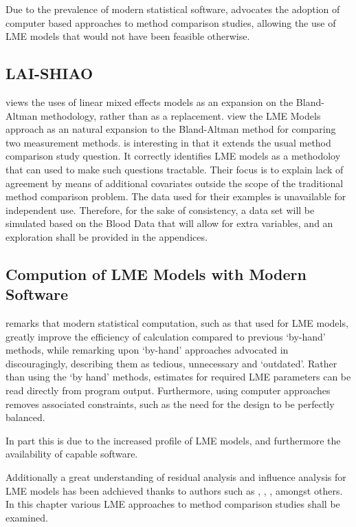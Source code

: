 \documentclass[12pt, a4paper]{report}
\theoremstyle{plain}
\theoremstyle{definition}
\theoremstyle{remark}
\begin{document}
	
	Due to the prevalence of modern statistical software, \citet{BXC2008} advocates the adoption of computer based approaches to method comparison studies, allowing the use of LME models that would not have been feasible otherwise.
	
	
	\subsection{LAI-SHIAO}
	\citet{LaiShiao} views
	the uses of linear mixed effects models as an expansion on the
	Bland-Altman methodology, rather than as a replacement.\citet{LaiShiao} view the LME Models approach as an natural expansion to the Bland-Altman method for comparing two measurement methods. \citet{LaiShiao} is interesting in that it extends the usual method comparison study question. It correctly identifies LME models as a methodoloy that can used to make such questions tractable. Their focus is to explain lack of agreement by means of additional covariates outside the scope of the traditional method comparison problem. The data used for their examples is unavailable for independent use. Therefore, for the sake of consistency, a data set will be simulated based on the Blood Data that will allow for extra variables, and an exploration shall be provided in the appendices.
	
	
	
	\subsection*{Compution of LME Models with Modern Software}
	\citet{BXC2008} remarks that modern statistical computation, such as that used for LME models, greatly improve the efficiency of
	calculation compared to previous `by-hand' methods, while remarking upon `by-hand' approaches advocated in \citet{BA99} discouragingly, describing them as tedious, unnecessary and `outdated'. Rather than using the `by hand' methods, estimates for required LME parameters can be read directly from program output. Furthermore, using computer approaches removes associated constraints, such as the need for the design to be perfectly balanced.
	
	In part this is due to the increased profile of LME models, and furthermore the availability of capable software.  
	
	Additionally a great understanding of residual analysis and influence analysis for LME models has been adchieved thanks to authors such as \citet{schabenberger}, \citet{Christensen}, \citet{cook86} \citet{west}, amongst others. In this chapter various LME approaches to method comparison studies shall
	be examined. 
	
\end{document}

